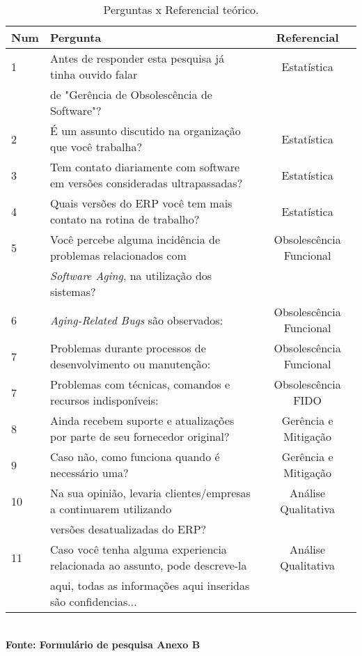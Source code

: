 \begin{table}[htb]
    \footnotesize
	\centering
	\caption{\hspace{0.1cm} Perguntas x Referencial teórico.}
	\vspace{-0.3cm} %
	\label{tab:tabela_p_r}
	\begin{tabular}{|l|l|c|}
		\hline
		\textbf{Num} & \textbf{Pergunta}	& \textbf{Referencial} \\
		\hline
	    1 & 
	   {Antes de responder esta pesquisa já tinha ouvido falar}	&
	    Estatística  \\
	     & 
	   de "Gerência de Obsolescência de Software"?	&
	      \\
	      \hline
	      2 & 
	   {É um assunto discutido na organização que você trabalha?}	&
	    Estatística  \\
	      \hline
	      	      3 & 
	   {Tem contato diariamente com software em versões consideradas ultrapassadas?}	&
	    Estatística  \\
	      \hline
	   	      	      4 & 
	   {Quais versões do ERP você tem mais contato na rotina de trabalho?}	&
	    Estatística  \\
	      \hline
        5 & 
	   {Você percebe alguma incidência de problemas relacionados com }	&
	    Obsolescência Funcional  \\
	     & 
	    \textit{Software Aging}, na utilização dos sistemas?	&
	      \\
	      \hline
	      6 & 
	   {\textit{Aging-Related Bugs} são observados:}	&
	    Obsolescência Funcional  \\
	      \hline
	      	      7 & 
	   {Problemas durante processos de desenvolvimento ou manutenção:}	&
	    Obsolescência Funcional  \\
	      \hline
	     	      	      7 & 
	   {Problemas com técnicas, comandos e recursos indisponíveis:}	&
	    Obsolescência FIDO  \\
	      \hline 
	       8 & 
	   {Ainda recebem suporte e atualizações por parte de seu fornecedor original?}	&
	    Gerência e Mitigação \\
	      \hline 
	   	       9 & 
	   {Caso não, como funciona quando é necessário uma?}	&
	    Gerência e Mitigação  \\
	      \hline 
	      10 & 
	   {Na sua opinião, levaria clientes/empresas a continuarem utilizando}	&
	    Análise Qualitativa  \\
	     & 
	   versões desatualizadas do ERP?	&
	      \\
	      \hline
	      11 & 
	   {Caso você tenha alguma experiencia relacionada ao assunto, pode descreve-la }	&
	     Análise Qualitativa  \\
	     & 
	   aqui, todas as informações aqui inseridas são confidencias...	&
	      \\
	      \hline
	\end{tabular}
	\vspace{.1cm}  %
	\small
	{\footnotesize\\ \textbf{Fonte: Formulário de pesquisa Anexo B}}
\end{table}
